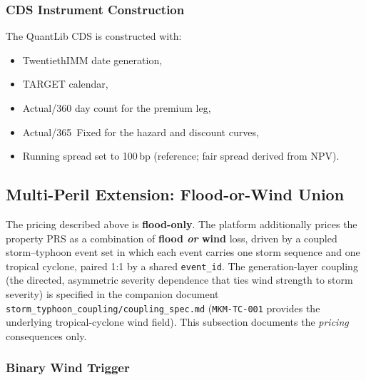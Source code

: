 \documentclass[11pt,a4paper]{article}
\begin{document}
\subsubsection{CDS Instrument Construction}

The QuantLib CDS is constructed with:
\begin{itemize}[nosep]
    \item TwentiethIMM date generation,
    \item TARGET calendar,
    \item Actual/360 day count for the premium leg,
    \item Actual/365~Fixed for the hazard and discount curves,
    \item Running spread set to 100\,bp (reference; fair spread derived from NPV).
\end{itemize}


\subsection{Multi-Peril Extension: Flood-or-Wind Union}
\label{sec:multiperil}

The pricing described above is \textbf{flood-only}. The platform additionally
prices the property PRS as a combination of \textbf{flood \emph{or} wind} loss,
driven by a coupled storm--typhoon event set in which each event carries one
storm sequence and one tropical cyclone, paired 1:1 by a shared
\texttt{event\_id}. The generation-layer coupling (the directed, asymmetric
severity dependence that ties wind strength to storm severity) is specified in
the companion document \texttt{storm\_typhoon\_coupling/coupling\_spec.md}
(\texttt{MKM-TC-001} provides the underlying tropical-cyclone wind field).
This subsection documents the \emph{pricing} consequences only.

\subsubsection{Binary Wind Trigger}
\end{document}
